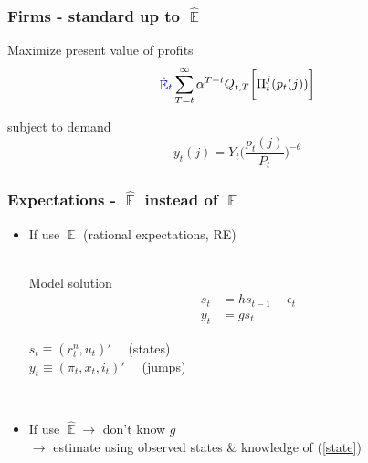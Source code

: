 \documentclass{beamer}
\DeclareMathOperator{\E}{\mathbb{E}}
\begin{document}
\begin{frame}
	\frametitle{Firms - standard up to $\hat{\E}$}

Maximize present value of profits
\begin{equation}
\textcolor{blue}{\hat{\E}_t}\sum^{\infty}_{T=t}\alpha^{T-t} Q_{t,T} \bigg[ \Pi^j_t(p_t(j))\bigg]
\label{lifetime_profits}
\end{equation}

subject to demand
\begin{equation}
y_t(j) = Y_t \bigg(\frac{p_t(j)}{P_t}\bigg)^{-\theta}
\end{equation}


\vfill

\hyperlink{details_HHs_firms}{}

\end{frame}

\begin{frame}
	\frametitle{Expectations - $\hat{\E}$ instead of $\E$}

\begin{itemize}
\item If use $\E$ (rational expectations, RE) \\

\

Model solution 
 \begin{align}
 s_t & = h s_{t-1} + \epsilon_t \label{state} \\
 y_t & = g s_t \label{obs_RE}
 \end{align}


$s_t \equiv (r^n_t, u_t)' \quad $  (states) \\
$y_t \equiv (\pi_t, x_t, i_t)' \quad $ (jumps)

\

\item If use $\hat{\E} \rightarrow$ don't know $g$ \\
$\rightarrow$ estimate using observed states \& knowledge of (\ref{state})
\end{itemize}



\end{frame}
\end{document}
